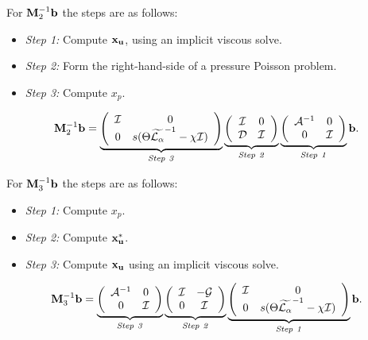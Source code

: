 \documentclass[final]{siamltex}
\def\bb {{\bf b}}
\def\Mb {{\bf M}}
\def\ub {{\bf u}}
\def\xb {{\bf x}}
\begin{document}
For $\Mb^{-1}_2\bb$ the steps are as follows:
\begin{itemize}
\item {\it Step 1:} Compute $\xb_{\ub}$, using an implicit viscous solve.
\item {\it Step 2:} Form the right-hand-side of a pressure Poisson problem.
\item {\it Step 3:} Compute $x_p$.
\end{itemize}
\begin{equation}
\Mb^{-1}_2\bb =
\underbrace{
\left(\begin{array}{cc}
\mathcal{I} & 0 \\
0 & s(\Theta \widetilde{\mathcal{L}_\alpha}^{-1} - \chi \mathcal{I}) 
\end{array}\right)
}_{\rm{\it Step~3}}
\underbrace{
\left(\begin{array}{cc}
\mathcal{I} & 0\\
\mathcal{D} & \mathcal{I}
\end{array}\right)
}_{\rm{\it Step~2}}
\underbrace{
\left(\begin{array}{cc}
\mathcal{A}^{-1} & 0\\
0 & \mathcal{I}
\end{array}\right)
}_{\rm{\it Step~1}}
\bb.
\end{equation}

For $\Mb^{-1}_3\bb$ the steps are as follows:
\begin{itemize}
\item {\it Step 1:} Compute $x_p$.
\item {\it Step 2:} Compute $\xb_{\ub}^*$.
\item {\it Step 3:} Compute $\xb_{\ub}$ using an implicit viscous solve.
\end{itemize}
\begin{equation}
\Mb^{-1}_3\bb =
\underbrace{
\left(\begin{array}{cc}
\mathcal{A}^{-1} & 0\\
0 & \mathcal{I}
\end{array}\right)
}_{\rm{\it Step~3}}
\underbrace{
\left(\begin{array}{cc}
\mathcal{I} & -\mathcal{G}\\
0 & \mathcal{I}
\end{array}\right)
}_{\rm{\it Step~2}}
\underbrace{
\left(\begin{array}{cc}
\mathcal{I} & 0 \\
0 & s(\Theta \widetilde{\mathcal{L}_\alpha}^{-1}- \chi \mathcal{I}) 
\end{array}\right)
}_{\rm{\it Step~1}}
\bb.
\end{equation}
\end{document}
